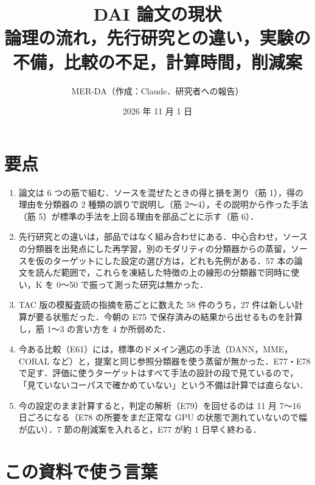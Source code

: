 \documentclass[a4paper,11pt]{ltjsarticle}
\title{DAI 論文の現状\\[2pt]\large 論理の流れ，先行研究との違い，実験の不備，比較の不足，計算時間，削減案}
\author{MER-DA（作成：Claude．研究者への報告）}
\date{2026 年 11 月 1 日}
\begin{document}
\maketitle

\section*{要点}

\begin{enumerate}
\item 論文は 6 つの筋で組む．ソースを混ぜたときの得と損を測り（筋 1），得の理由を分類器の 2 種類の誤りで説明し（筋 2〜4），その説明から作った手法（筋 5）が標準の手法を上回る理由を部品ごとに示す（筋 6）．
\item 先行研究との違いは，部品ではなく組み合わせにある．中心合わせ，ソースの分類器を出発点にした再学習，別のモダリティの分類器からの蒸留，ソースを仮のターゲットにした設定の選び方は，どれも先例がある．57 本の論文を読んだ範囲で，これらを凍結した特徴の上の線形の分類器で同時に使い，K を 0〜50 で振って測った研究は無かった．
\item TAC 版の模擬査読の指摘を筋ごとに数えた 58 件のうち，27 件は新しい計算が要る状態だった．今朝の E75 で保存済みの結果から出せるものを計算し，筋 1〜3 の言い方を 4 か所弱めた．
\item 今ある比較（E61）には，標準のドメイン適応の手法（DANN，MME，CORAL など）と，提案と同じ参照分類器を使う蒸留が無かった．E77・E78 で足す．評価に使うターゲットはすべて手法の設計の段で見ているので，「見ていないコーパスで確かめていない」という不備は計算では直らない．
\item 今の設定のまま計算すると，判定の解析（E79）を回せるのは 11 月 7〜16 日ごろになる（E78 の所要をまだ正常な GPU の状態で測れていないので幅が広い）．7 節の削減案を入れると，E77 が約 1 日早く終わる．
\end{enumerate}

\section{この資料で使う言葉}
\end{document}
